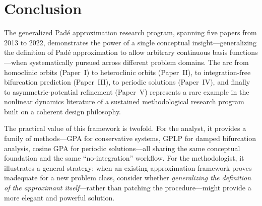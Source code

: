 \documentclass[11pt,a4paper]{article}
\begin{document}
\section{Conclusion}

The generalized Pad\'e approximation research program, spanning five papers from 2013 to 2022, demonstrates the power of a single conceptual insight---generalizing the definition of Pad\'e approximation to allow arbitrary continuous basis functions---when systematically pursued across different problem domains. The arc from homoclinic orbits (Paper~I) to heteroclinic orbits (Paper~II), to integration-free bifurcation prediction (Paper~III), to periodic solutions (Paper~IV), and finally to asymmetric-potential refinement (Paper~V) represents a rare example in the nonlinear dynamics literature of a sustained methodological research program built on a coherent design philosophy.

The practical value of this framework is twofold. For the analyst, it provides a family of methods---GPA for conservative systems, GPLP for damped bifurcation analysis, cosine GPA for periodic solutions---all sharing the same conceptual foundation and the same ``no-integration'' workflow. For the methodologist, it illustrates a general strategy: when an existing approximation framework proves inadequate for a new problem class, consider whether \emph{generalizing the definition of the approximant itself}---rather than patching the procedure---might provide a more elegant and powerful solution.
\end{document}
